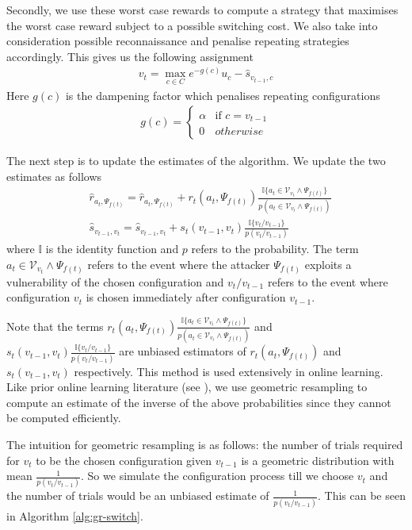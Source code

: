 \documentclass[sigconf]{aamas}  %
\newcommand{\cal}[1]{\mathcal{#1}}
\theoremstyle{definition}
\theoremstyle{definition}
\begin{document}
Secondly, we use these worst case rewards to compute a strategy that maximises the worst case reward subject to a possible switching cost. We also take into consideration possible reconnaissance and penalise repeating strategies accordingly. This gives us the following assignment
\begin{align*}
    v_t = \max_{c \in C} e^{-g(c)} u_c - \hat{s}_{v_{t-1}, c}
\end{align*}
Here $g(c)$ is the dampening factor which penalises repeating configurations
\begin{align*}
    g(c) = 
    \begin{cases}
        \alpha & \text{if } c = v_{t-1} \\
        0 & otherwise
    \end{cases}
\end{align*}

The next step is to update the estimates of the algorithm. We update the two estimates as follows
\begin{align*}
    &\hat{r}_{a_t, \Psi_{f(t)}} = \hat{r}_{a_t, \Psi_{f(t)}} + r_t(a_t, \Psi_{f(t)})\frac{\mathbb{I}\{a_t \in \cal V_{v_t} \land \Psi_{f(t)}\}}{p(a_t \in \cal V_{v_t} \land \Psi_{f(t)})} \\
    &\hat{s}_{v_{t-1}, v_t} = \hat{s}_{v_{t-1}, v_t} + s_t(v_{t-1}, v_t)\frac{\mathbb{I}\{v_t/v_{t-1}\}}{p(v_t/v_{t-1})}
\end{align*}
where $\mathbb{I}$ is the identity function and $p$ refers to the probability. The term $a_t \in \cal V_{v_t} \land \Psi_{f(t)}$ refers to the event where the attacker $\Psi_{f(t)}$ exploits a vulnerability of the chosen configuration and $v_t/v_{t-1}$ refers to the event where configuration $v_t$ is chosen immediately after configuration $v_{t-1}$. 

Note that the terms $r_t(a_t, \Psi_{f(t)})\frac{\mathbb{I}\{a_t \in \cal V_{v_t} \land \Psi_{f(t)}\}}{p(a_t \in \cal V_{v_t} \land \Psi_{f(t)})}$ and \\ $s_t(v_{t-1}, v_t)\frac{\mathbb{I}\{v_t/v_{t-1}\}}{p(v_t/v_{t-1})}$ are unbiased estimators of $r_t(a_t, \Psi_{f(t)})$ and $s_t(v_{t-1}, v_t)$ respectively. This method is used extensively in online learning. Like prior online learning literature (see \cite{neuandbartok2013fpl}), we use geometric resampling to compute an estimate of the inverse of the above probabilities since they cannot be computed efficiently. 

The intuition for geometric resampling is as follows: the number of trials required for $v_t$ to be the chosen configuration given $v_{t-1}$ is a geometric distribution with mean $\frac{1}{p(v_t/v_{t-1})}$. So we simulate the configuration process till we choose $v_t$ and the number of trials would be an unbiased estimate of $\frac{1}{p(v_t/v_{t-1})}$. This can be seen in Algorithm \ref{alg:gr-switch}.
\end{document}
